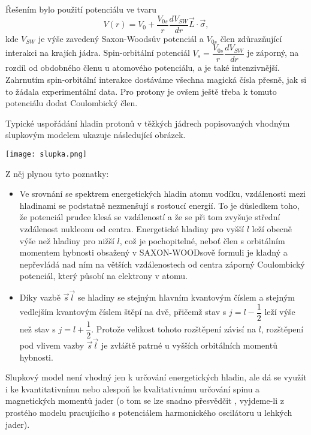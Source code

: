 \documentclass[../../main.tex]{subfiles}
\begin{document}
Řešením bylo použití potenciálu ve tvaru
\begin{equation}
V(r) = V_0 + \dfrac{V_{0s}}{r}\dfrac{dV_{SW}}{dr} \vec{L} \cdotp \vec{\sigma},
\end{equation}
kde $V_{SW}$ je výše zavedený Saxon-Woodsův potenciál a $V_{0s}$ člen zdůrazňující interakci na krajích jádra. Spin-orbitální potenciál $V_s = \dfrac{V_{0s}}{r}\dfrac{dV_{SW}}{dr}$ je záporný, na rozdíl od obdobného členu u atomového potenciálu, a je také intenzivnější. Zahrnutím spin-orbitální interakce dostáváme všechna magická čísla přesně, jak si to žádala experimentální data. Pro protony je ovšem ještě třeba k tomuto potenciálu dodat Coulombický člen.

Typické uspořádání hladin protonů v těžkých jádrech popisovaných vhodným slupkovým modelem ukazuje následující obrázek.


\begin{center}
	\texttt{[image: slupka.png]}
\end{center}

Z něj plynou tyto poznatky: 
\begin{itemize}
	\item Ve srovnání se spektrem energetických hladin atomu vodíku, vzdálenosti mezi hladinami se podstatně nezmenšují s rostoucí energií. To je důsledkem toho, že potenciál prudce klesá se vzdáleností a že se při tom zvyšuje střední vzdálenost nukleonu od centra. Energetické hladiny pro vyšší $l$ leží obecně výše než hladiny pro nižší $l$, což je pochopitelné, neboť člen s orbitálním momentem hybnosti obsažený v SAXON-WOODsově formuli je kladný a nepřevládá nad ním na větších vzdálenostech od centra záporný Coulombický potenciál, který působí na elektrony v atomu.
	
	\item Díky vazbě $\vec{s} \vec{l}$ se hladiny se stejným hlavním kvantovým číslem a stejným vedlejším kvantovým číslem štěpí na dvě, přičemž stav s $j = l - \dfrac{1}{2}$ leží výše než stav s $j = l + \dfrac{1}{2}$. Protože velikost tohoto rozštěpení závisí na $l$, rozštěpení pod vlivem vazby $\vec{s} \vec{l}$ je zvláště patrné u vyšších orbitálních momentů hybnosti.
\end{itemize}	

Slupkový model není vhodný jen k určování energetických hladin, ale dá se využít i ke kvantitativnímu nebo alespoň ke kvalitativnímu určování spinu a magnetických momentů jader (o tom se lze snadno přesvědčit , vyjdeme-li z prostého modelu pracujícího s potenciálem harmonického oscilátoru u lehkých jader).
	
\end{document}
